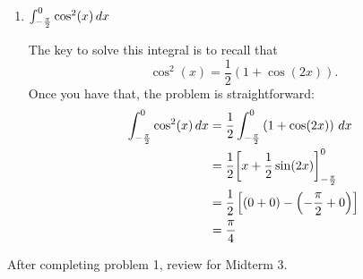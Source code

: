 \documentclass[nooutcomes]{ximera}
\begin{document}
\begin{problem}
\begin{enumerate}
	\item  $\int_{- \frac{\pi}{2}}^0 \cos^2 (x) \,d x$
		\begin{freeResponse}
		The key to solve this integral is to recall that
		$$ \cos^2 (x) = \frac{1}{2} \left( 1 + \cos(2x) \right) .$$
		Once you have that, the problem is straightforward:
			\begin{align*}
			\int_{- \frac{\pi}{2}}^0 \cos^2 (x) \,d x &= \frac{1}{2} \int_{- \frac{\pi}{2}}^0 \left( 1 + \cos(2x) \right) \,d x  \\
			&= \frac{1}{2} \bigg[  x + \frac{1}{2} \sin(2x)   \bigg]_{- \frac{\pi}{2}}^0  \\
			&= \frac{1}{2} \left[ (0 + 0) - \left(- \frac{\pi}{2} + 0 \right) \right]  \\
			&= \frac{\pi}{4}
			\end{align*}
		\end{freeResponse}
		
		
		
	\end{enumerate}
		
		
\end{problem}




After completing problem 1, review for Midterm 3.


















	
	
	
	
	
	
	
	
	

	










								
				
				
	
\end{document}
